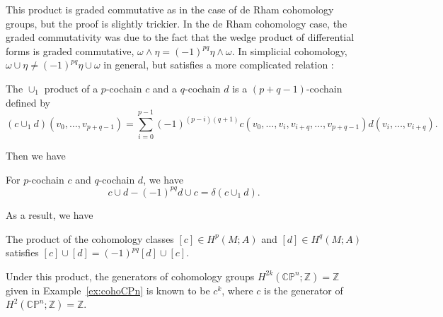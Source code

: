 \documentclass[12pt]{article}
\numberwithin{equation}{section}
\theoremstyle{remark}
\def\bZ{\mathbb{Z}}
\def\CP{\mathbb{CP}}
\begin{document}
This product is graded commutative as in the case of de Rham cohomology groups,
but the proof is slightly trickier.
In the de Rham cohomology case,
the graded commutativity was due to the fact that the wedge product of differential forms is graded commutative,
$\omega\wedge\eta=(-1)^{pq}\eta\wedge\omega$.
In simplicial cohomology,
$\omega \cup \eta \neq (-1)^{pq} \eta \cup \omega$ in general,
but satisfies a more complicated relation \cite{SteenrodHigherProduct}:
\begin{definition}
The $\cup_1$ product of a $p$-cochain $c$ and a $q$-cochain $d$ is 
a $(p+q-1)$-cochain
defined by \begin{equation}
(c\cup_1 d)(v_0,\ldots,v_{p+q-1}) = \sum_{i=0}^{p-1} (-1)^{(p-i)(q+1)}c(v_0,\ldots,v_i,v_{i+q},\ldots,v_{p+q-1}) d(v_i,\ldots,v_{i+q}).
\end{equation}
\end{definition}
Then we have 
\begin{proposition}
For $p$-cochain $c$ and $q$-cochain $d$, we have \begin{equation}
c\cup d-(-1)^{pq}d\cup c = \delta(c\cup_1 d) .
\end{equation}
\end{proposition}
As a result, we have 
\begin{corollary}
The product of the cohomology classes $[c]\in H^p(M;A)$ and $[d]\in H^q(M;A)$
satisfies $[c]\cup [d] = (-1)^{pq}[d]\cup [c]$.
\end{corollary}

Under this product, the generators of cohomology groups $H^{2k}(\CP^n;\bZ)=\bZ$
given in Example~\ref{ex:cohoCPn}
is known to be $c^k$, where $c$ is the generator of $H^2(\CP^n;\bZ)=\bZ$.
\end{document}

